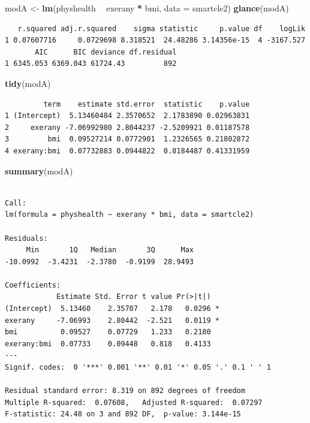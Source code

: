 \documentclass[]{book}
\newenvironment{Shaded}{\begin{snugshade}}{\end{snugshade}}
\newcommand{\KeywordTok}[1]{\textcolor[rgb]{0.13,0.29,0.53}{\textbf{#1}}}
\newcommand{\DataTypeTok}[1]{\textcolor[rgb]{0.13,0.29,0.53}{#1}}
\newcommand{\StringTok}[1]{\textcolor[rgb]{0.31,0.60,0.02}{#1}}
\newcommand{\OperatorTok}[1]{\textcolor[rgb]{0.81,0.36,0.00}{\textbf{#1}}}
\newcommand{\NormalTok}[1]{#1}
\theoremstyle{definition}
\theoremstyle{definition}
\theoremstyle{definition}
\theoremstyle{remark}
\begin{document}
\begin{Shaded}
\begin{Highlighting}[]
\NormalTok{modA <-}\StringTok{ }\KeywordTok{lm}\NormalTok{(physhealth }\OperatorTok{~}\StringTok{ }\NormalTok{exerany }\OperatorTok{*}\StringTok{ }\NormalTok{bmi, }\DataTypeTok{data =}\NormalTok{ smartcle2)}
\KeywordTok{glance}\NormalTok{(modA)}
\end{Highlighting}
\end{Shaded}

\begin{verbatim}
   r.squared adj.r.squared    sigma statistic     p.value df    logLik
1 0.07607716     0.0729698 8.318521  24.48286 3.14356e-15  4 -3167.527
       AIC      BIC deviance df.residual
1 6345.053 6369.043 61724.43         892
\end{verbatim}

\begin{Shaded}
\begin{Highlighting}[]
\KeywordTok{tidy}\NormalTok{(modA)}
\end{Highlighting}
\end{Shaded}

\begin{verbatim}
         term    estimate std.error  statistic    p.value
1 (Intercept)  5.13460484 2.3570652  2.1783890 0.02963831
2     exerany -7.06992980 2.8044237 -2.5209921 0.01187578
3         bmi  0.09527214 0.0772901  1.2326565 0.21802872
4 exerany:bmi  0.07732883 0.0944822  0.8184487 0.41331959
\end{verbatim}

\begin{Shaded}
\begin{Highlighting}[]
\KeywordTok{summary}\NormalTok{(modA)}
\end{Highlighting}
\end{Shaded}

\begin{verbatim}

Call:
lm(formula = physhealth ~ exerany * bmi, data = smartcle2)

Residuals:
     Min       1Q   Median       3Q      Max 
-10.0992  -3.4231  -2.3780  -0.9199  28.9493 

Coefficients:
            Estimate Std. Error t value Pr(>|t|)  
(Intercept)  5.13460    2.35707   2.178   0.0296 *
exerany     -7.06993    2.80442  -2.521   0.0119 *
bmi          0.09527    0.07729   1.233   0.2180  
exerany:bmi  0.07733    0.09448   0.818   0.4133  
---
Signif. codes:  0 '***' 0.001 '**' 0.01 '*' 0.05 '.' 0.1 ' ' 1

Residual standard error: 8.319 on 892 degrees of freedom
Multiple R-squared:  0.07608,   Adjusted R-squared:  0.07297 
F-statistic: 24.48 on 3 and 892 DF,  p-value: 3.144e-15
\end{verbatim}


\end{document}
